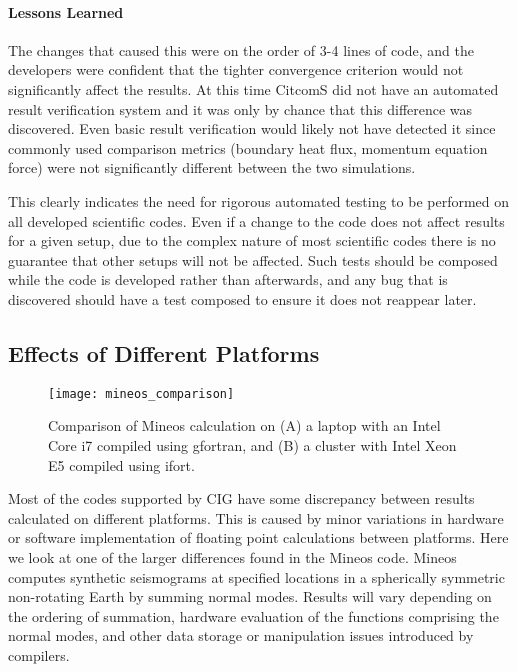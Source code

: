 \documentclass{acm_proc_article-sp}
\begin{document}
\paragraph*{Lessons Learned}
The changes that caused this were on the order of 3-4 lines of code, and the developers were confident that the tighter convergence criterion would not significantly affect the results.  At this time CitcomS did not have an automated result verification system and it was only by chance that this difference was discovered.  Even basic result verification would likely not have detected it since commonly used comparison metrics (boundary heat flux, momentum equation force) were not significantly different between the two simulations.

This clearly indicates the need for rigorous automated testing to be performed on all developed scientific codes.  Even if a change to the code does not affect results for a given setup, due to the complex nature of most scientific codes there is no guarantee that other setups will not be affected. Such tests should be composed while the code is developed rather than afterwards, and any bug that is discovered should have a test composed to ensure it does not reappear later.

\subsection{Effects of Different Platforms}
\begin{figure}
\centering
\texttt{[image: mineos\_comparison]}
\caption{Comparison of Mineos calculation on (A) a laptop with an Intel Core i7 compiled using gfortran, and (B) a cluster with Intel Xeon E5 compiled using ifort.}
\label{fig-mineos-multi-platform}
\end{figure}

Most of the codes supported by CIG have some discrepancy between results calculated on different platforms.  This is caused by minor variations in hardware or software implementation of floating point calculations between platforms.  Here we look at one of the larger differences found in the Mineos code.  Mineos computes synthetic seismograms at specified locations in a spherically symmetric non-rotating Earth by summing normal modes.  Results will vary depending on the ordering of summation, hardware evaluation of the functions comprising the normal modes, and other data storage or manipulation issues introduced by compilers.
\end{document}
